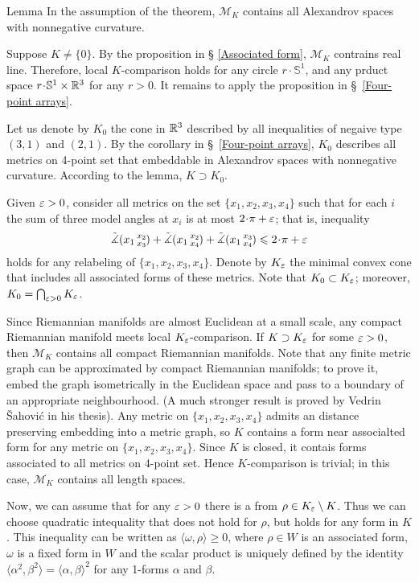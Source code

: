 \documentclass[a4paper,10pt]{article}
\begin{document}
\begin{thm}{Lemma}
In the assumption of the theorem, $\mathcal{M}_K$ contains all Alexandrov spaces with nonnegative curvature.
\end{thm}

Suppose $K\ne\{0\}$.
By the proposition in § \ref{Associated form}, $\mathcal{M}_K$ contrains real line.
Therefore, local $K$-comparison holds for any circle $r\cdot \mathbb{S}^1$, and any prduct space $r\cdot \mathbb{S}^1\times\RR^3$ for any $r>0$.
It remains to apply the proposition in §~\ref{Four-point arrays}.
\qeds

Let us denote by $K_0$ the cone in $\mathbb{R}^3$ described by all inequalities of negaive type $(3,1)$ and $(2,1)$.
By the corollary in §~\ref{Four-point arrays}, $K_0$ describes all metrics on 4-point set that embeddable in Alexandrov spaces with nonnegative curvature.
According to the lemma, $K\supset K_0$.

Given $\varepsilon>0$, consider all metrics on the set $\{x_1,x_2,x_3,x_4\}$ such that for each $i$
the sum of three model angles at $x_i$ is at most $2\cdot\pi+\eps$; that is, inequality
\[\angk{x_1}{x_2}{x_3}+\angk{x_1}{x_2}{x_4}+\angk{x_1}{x_3}{x_4}\le 2\cdot\pi+\eps\]
holds for any relabeling of $\{x_1,x_2,x_3,x_4\}$.
Denote by $K_\varepsilon$ the minimal convex cone that includes all associated forms of these metrics.
Note that $K_0\subset K_\varepsilon$;
moreover, $K_0=\bigcap_{\varepsilon>0} K_\varepsilon$.

Since Riemannian manifolds are almost Euclidean at a small scale,
any compact Riemannian manifold meets local $K_\varepsilon$-comparison.
If $K\supset K_\varepsilon$ for some $\varepsilon>0$, then $\mathcal{M}_K$ contains all compact Riemannian manifolds.
Note that any finite metric graph can be approximated by compact Riemannian manifolds;
to prove it, embed the graph isometrically in the Euclidean space and pass to a boundary of an appropriate neighbourhood.
(A much stronger result is proved by Vedrin Šahović \cite{sahovic2009} in his thesis).
Any metric on $\{x_1,x_2,x_3,x_4\}$ admits an distance preserving embedding into a metric graph, so $K$ contains a form near associalted form for any metric on $\{x_1,x_2,x_3,x_4\}$.
Since $K$ is closed, it contais forms associated to all metrics on 4-point set.
Hence $K$-comparison is trivial; in this case, $\mathcal{M}_K$ contains all length spaces.

Now, we can assume that for any $\varepsilon>0$ there is a from $\rho\in K_\varepsilon\setminus K$.
Thus we can choose quadratic intequality that does not hold for $\rho$, but holds for any form in $K$.
This inequality can be written as $\langle \omega,\rho \rangle\ge 0$, where $\rho\in W$ is an associated form, $\omega$ is a fixed form in $W$ and the scalar product is uniquely defined by the identity $\langle \alpha^2,\beta^2\rangle=\langle\alpha,\beta\rangle^2$ for any 1-forms $\alpha$ and $\beta$.
\end{document}

